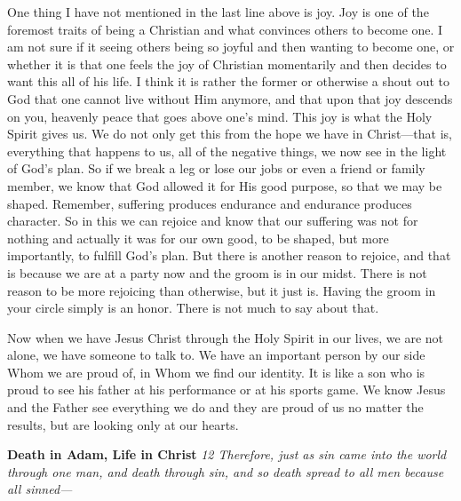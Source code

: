 One thing I have not mentioned in the last line above is joy. Joy is one
of the foremost traits of being a Christian and what convinces others to
become one. I am not sure if it seeing others being so joyful and then
wanting to become one, or whether it is that one feels the joy of
Christian momentarily and then decides to want this all of his life. I
think it is rather the former or otherwise a shout out to God that one
cannot live without Him anymore, and that upon that joy descends on you,
heavenly peace that goes above one's mind. This joy is what the Holy
Spirit gives us. We do not only get this from the hope we have in
Christ---that is, everything that happens to us, all of the negative
things, we now see in the light of God's plan. So if we break a leg or
lose our jobs or even a friend or family member, we know that God
allowed it for His good purpose, so that we may be shaped. Remember,
suffering produces endurance and endurance produces character. So in
this we can rejoice and know that our suffering was not for nothing and
actually it was for our own good, to be shaped, but more importantly, to
fulfill God's plan. But there is another reason to rejoice, and that is
because we are at a party now and the groom is in our midst. There is
not reason to be more rejoicing than otherwise, but it just is. Having
the groom in your circle simply is an honor. There is not much to say
about that.

Now when we have Jesus Christ through the Holy Spirit in our lives, we
are not alone, we have someone to talk to. We have an important person
by our side Whom we are proud of, in Whom we find our identity. It is
like a son who is proud to see his father at his performance or at his
sports game. We know Jesus and the Father see everything we do and they
are proud of us no matter the results, but are looking only at our
hearts.

\textbf{Death in Adam, Life in Christ} \emph{12 Therefore, just as sin
came into the world through one man, and death through sin, and so death
spread to all men because all sinned---}

